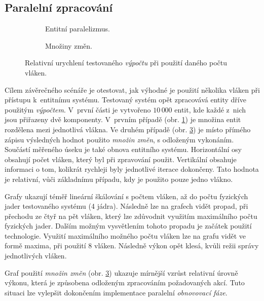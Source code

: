 \subsection{Paralelní zpracování}

\begin{figure}[H]
		\centering
	\begin{subfigure}[b]{0.49\textwidth}
		\caption{Entitní paralelizmus.}\label{Fig:EVALPar}
	\end{subfigure}
	\begin{subfigure}[b]{0.49\textwidth}
		\caption{Množiny změn.}\label{Fig:EVALChangeset}
	\end{subfigure}
	\caption{Relativní urychlení testovaného \emph{výpočtu} při použití daného počtu vláken.}
\end{figure}

Cílem závěrečného scénáře je otestovat, jak výhodné je použití několika vláken při přístupu k~entitnímu systému. Testovaný systém opět zpracovává entity dříve použitým \emph{výpočtem}. V~první části je vytvořeno $10\,000$ entit, kde každé z~nich jsou přiřazeny dvě komponenty. V~prvním případě (obr. \ref{Fig:EVALPar}) je množina entit rozdělena mezi jednotlivá vlákna. Ve druhém případě (obr. \ref{Fig:EVALChangeset}) je místo přímého zápisu výsledných hodnot použito \emph{množin změn}, s odloženým vykonáním. Součástí měřeného úseku je také obnova entitního systému. Horizontální osy obsahují počet vláken, který byl při zpravování použit. Vertikální obsahuje informaci o tom, kolikrát rychleji byly jednotlivé iterace dokončeny. Tato hodnota je relativní, vůči základnímu případu, kdy je použito pouze jedno vlákno.

Grafy ukazují téměř lineární škálování s počtem vláken, až do počtu fyzických jader testovaného systému (4 jádra). Následně lze na grafech vidět propad, při přechodu ze čtyř na pět vláken, který lze zdůvodnit využitím maximálního počtu fyzických jader. Dalším možným vysvětlením tohoto propadu je začátek použití technologie. Využití maximálního možného počtu vláken lze na grafu vidět ve formě maxima, při použití 8 vláken. Následně výkon opět klesá, kvůli režii správy jednotlivých vláken.

Graf použití \emph{množin změn} (obr. \ref{Fig:EVALChangeset}) ukazuje mírnější vzrůst relativní úrovně výkonu, která je způsobena odloženým zpracováním požadovaných akcí. Tuto situaci lze vylepšit dokončením implementace paralelní \emph{obnovovací fáze}.

